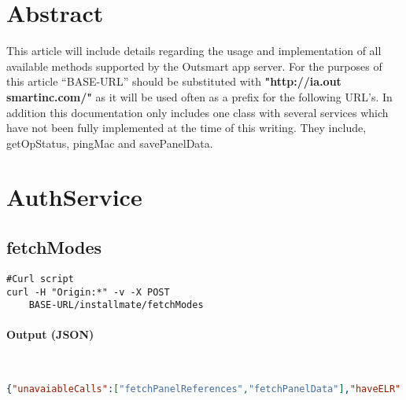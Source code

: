 \documentclass[
10pt, %
letterpaper, %
oneside, %
headinclude,footinclude, %
BCOR5mm, %
]{scrartcl}
\title{\normalfont\spacedallcaps{Installmate REST API}} %
\author{\spacedlowsmallcaps{Michael Meding* , mmeding@outsmartinc.com}} %
\date{} %
\begin{document}
\maketitle %

\setcounter{tocdepth}{2} %

\tableofcontents %

\thispagestyle{empty} %

 
\section*{Abstract}

 This article will include details regarding the usage and implementation of all available methods supported by the Outsmart app server. For the purposes of this article ``BASE-URL'' should be 
 substituted with \textbf{"http://ia.out smartinc.com/"} as it will be used often as a prefix for the following URL's.
 In addition this documentation only includes one class with several services which have not been fully implemented at the time of this writing. They include, getOpStatus, pingMac and savePanelData.
 



\section{AuthService}


\subsection{\textbf{fetchModes}}
\begin{lstlisting}
#Curl script
curl -H "Origin:*" -v -X POST
	BASE-URL/installmate/fetchModes
\end{lstlisting}

\paragraph{Output (JSON)}~
\begin{lstlisting}[language=json]
{"unavaiableCalls":["fetchPanelReferences","fetchPanelData"],"haveELR":true}
\end{lstlisting}
\end{document}
